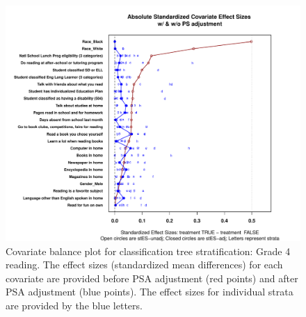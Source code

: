 \begin{figure}
\begin{center}
\includegraphics[width=\textwidth]{../Figures2009/g4read-tree-balance.pdf}
\caption[Covariate balance plot for classification tree stratification: Grade 4 reading]{Covariate balance plot for classification tree stratification: Grade 4 reading. The effect sizes (standardized mean differences) for each covariate are provided before PSA adjustment (red points) and after PSA adjustment (blue points). The effect sizes for individual strata are provided by the blue letters.}
\end{center}
\end{figure}

